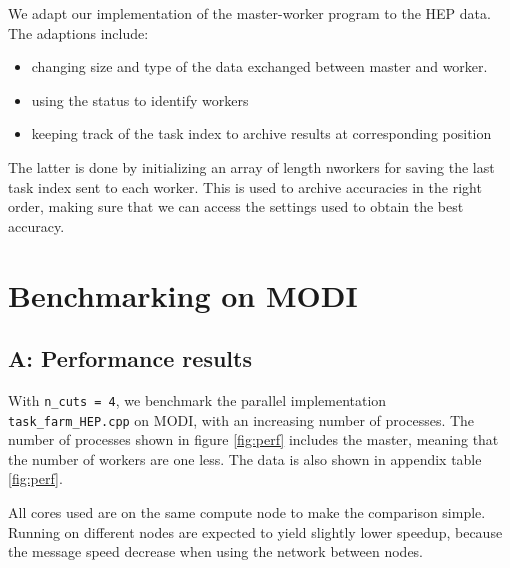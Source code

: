 \documentclass{article}
\begin{document}
We adapt our implementation of the master-worker program to the HEP data. The adaptions include:

\begin{itemize}
    \item changing size and type of the data exchanged between master and worker.
    \item using the status to identify workers
    \item keeping track of the task index to archive results at corresponding position
\end{itemize}

The latter is done by initializing an array of length nworkers for saving the last task index sent to each worker. This is used to archive accuracies in the right order, making sure that we can access the settings used to obtain the best accuracy.

\newpage

\section{Benchmarking on MODI}

\subsection*{A: Performance results}


With \lstinline{n_cuts = 4}, we benchmark the parallel implementation \lstinline{task_farm_HEP.cpp} on MODI, with an increasing number of processes. The number of processes shown in figure \ref{fig:perf} includes the master, meaning that the number of workers are one less. The data is also shown in appendix table \ref{fig:perf}.

All cores used are on the same compute node to make the comparison simple. Running on different nodes are expected to yield slightly lower speedup, because the message speed decrease when using the network between nodes.
\end{document}
